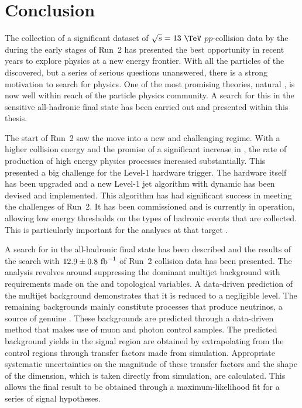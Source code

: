 \chapter{Conclusion}
\label{chap:conclusion}

The collection of a significant dataset of $\sqrt{s}=13~\tev$
$pp$-collision data by the \LHC during the early stages of Run~2 has
presented the best opportunity in recent years to explore \BSM physics
at a new energy frontier. With all the particles of the \SM
discovered, but a series of serious questions unanswered, there is a
strong motivation to search for \BSM physics. One of the most
promising \BSM theories, natural \SUSY, is now well within reach of
the particle physics community. A search for this in the
sensitive all-hadronic final state has been carried out and presented
within this thesis.

The start of Run~2 saw the \LHC move into a new and challenging
regime. With a higher collision energy and the promise of a
significant increase in \PU, the rate of production of high energy
physics processes increased substantially. This presented a
big challenge for the Level-1 hardware trigger. The hardware itself has been upgraded and a new Level-1 jet
algorithm with dynamic \PUS has been devised and implemented. This
algorithm has had significant success in meeting the challenges of
Run~2. It has been commissioned and is currently
in operation, allowing low energy thresholds on the types of hadronic
events that are collected. This is particularly important for the analyses at \CMS that
target \SUSY.

A search for \SUSY in the all-hadronic final state has been described
and the results of the search with $12.9\pm0.8~\text{fb}^{-1}$ of Run~2
collision data has been presented. The analysis revolves around
suppressing the dominant \QCD multijet background with requirements
made on the \alphat and \bdphi topological variables. A data-driven
prediction of the multijet background demonstrates that it
is reduced to a negligible level. The remaining backgrounds 
mainly constitute \SM processes that produce neutrinos, a
source of genuine \MET. These backgrounds are predicted through a
data-driven method that makes use of muon and photon control samples.
The predicted background yields in the signal region are obtained by
extrapolating from the control regions through transfer factors made
from
simulation. Appropriate systematic uncertainties on the magnitude of
these transfer factors and the shape of the \MHT dimension, which is
taken directly from simulation, are calculated. This allows the final result to
be obtained through a maximum-likelihood fit for a series of signal
hypotheses.

